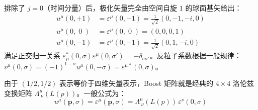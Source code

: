 \medskip
排除了 $j=0$（时间分量）后，极化矢量完全由空间自旋 $1$ 的球面基矢给出：
\begin{align}
    u^\mu(0,+1) &= \varepsilon^\mu(0,+1) = \frac{1}{\sqrt{2}}(0,-1,-i,0) \\
    u^\mu(0,\;0\;) &= \varepsilon^\mu(0,\;0\;) = (0,0,0,1) \\
    u^\mu(0,-1) &= \varepsilon^\mu(0,-1) = \frac{1}{\sqrt{2}}(0,1,-i,0)
\end{align}
满足正交归一关系 $\varepsilon^*_\mu(0,\sigma)\varepsilon^\mu(0,\sigma')=-\delta_{\sigma\sigma'}$。反粒子系数根据一般规律：$v^\mu(0,\sigma)=(-1)^{1-\sigma}u^\mu(0,-\sigma)=\varepsilon^{\mu*}(0,\sigma)$。
\vspace{2ex}\par

由于 $(1/2,1/2)$ 表示等价于四维矢量表示，Boost 矩阵就是经典的 $4\times 4$ 洛伦兹变换矩阵 $\Lambda^\mu_{\;\nu}(L(p))$。一般公式为：
\begin{equation}
    u^\mu(\boldsymbol{p},\sigma) = \varepsilon^\mu(\boldsymbol{p},\sigma) = \Lambda^\mu_{\;\nu}(L(p))\,\varepsilon^\nu(0,\sigma)
\end{equation}


